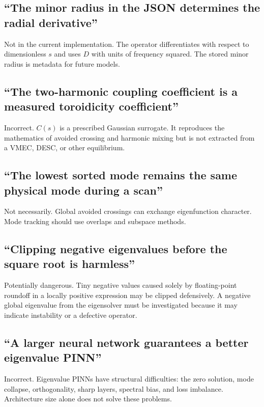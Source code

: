 \subsection{``The minor radius in the JSON determines the radial derivative''}
Not in the current implementation. The operator differentiates with respect to dimensionless $s$ and uses $D$ with units of frequency squared. The stored minor radius is metadata for future models.

\subsection{``The two-harmonic coupling coefficient is a measured toroidicity coefficient''}
Incorrect. $C(s)$ is a prescribed Gaussian surrogate. It reproduces the mathematics of avoided crossing and harmonic mixing but is not extracted from a VMEC, DESC, or other equilibrium.

\subsection{``The lowest sorted mode remains the same physical mode during a scan''}
Not necessarily. Global avoided crossings can exchange eigenfunction character. Mode tracking should use overlaps and subspace methods.

\subsection{``Clipping negative eigenvalues before the square root is harmless''}
Potentially dangerous. Tiny negative values caused solely by floating-point roundoff in a locally positive expression may be clipped defensively. A negative global eigenvalue from the eigensolver must be investigated because it may indicate instability or a defective operator.

\subsection{``A larger neural network guarantees a better eigenvalue PINN''}
Incorrect. Eigenvalue PINNs have structural difficulties: the zero solution, mode collapse, orthogonality, sharp layers, spectral bias, and loss imbalance. Architecture size alone does not solve these problems.


